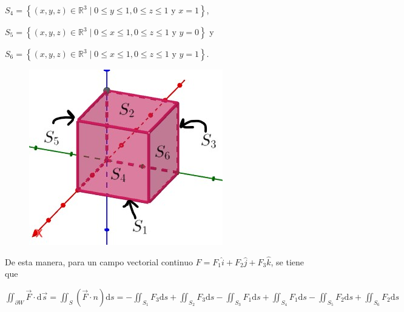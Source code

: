\documentclass[fleqn]{article}
\begin{document}
    $ S_4 = \left\lbrace (x,y,z) \in \mathbb{R}^3 \; \big| \; 0 \leq y \leq 1, 0 \leq z \leq 1 \text{ y } x = 1 \right\rbrace $,

    $ S_5 = \left\lbrace (x,y,z) \in \mathbb{R}^3 \; \big| \; 0 \leq x \leq 1, 0 \leq z \leq 1 \text{ y } y = 0 \right\rbrace $ y

    $ S_6 = \left\lbrace (x,y,z) \in \mathbb{R}^3 \; \big| \; 0 \leq x \leq 1, 0 \leq z \leq 1 \text{ y } y = 1 \right\rbrace $.

    \begin{figure}[htb]
        \centering
        \includegraphics{Caotura 6.jpg}
    \end{figure}

    De esta manera, para un campo vectorial continuo $ F = F_1 \widehat{i} + F_2 \widehat{j} + F_3 \widehat{k} $, se tiene que

    $ \displaystyle \iint_{\partial W} \overrightarrow{F} \cdot \mathrm{d} \overrightarrow{s} = \displaystyle \iint_S \left(\overrightarrow{F} \cdot n \right) \mathrm{d} s = - \displaystyle \iint_{S_1} F_3 \mathrm{d} s + \displaystyle \iint_{S_2} F_3 \mathrm{d} s - \displaystyle \iint_{S_3} F_1 \mathrm{d} s + \displaystyle \iint_{S_4} F_1 \mathrm{d} s - \displaystyle \iint_{S_5} F_2 \mathrm{d} s + \displaystyle \iint_{S_6} F_2 \mathrm{d} s $
\end{document}

